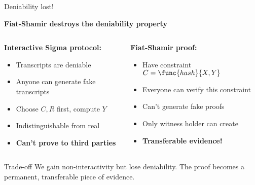 \documentclass[aspectratio=169, lualatex, handout]{beamer}
\begin{document}
\begin{frame}{Deniability lost!}
	\begin{center}
		\textbf{Fiat-Shamir destroys the deniability property}
	\end{center}
	\vspace{0.5em}
	\begin{columns}[c]
		\begin{column}{0.5\textwidth}
			\textbf{Interactive Sigma protocol:}
			\begin{itemize}
				\item Transcripts are deniable
				\item Anyone can generate fake transcripts
				\item Choose $C, R$ first, compute $Y$
				\item Indistinguishable from real
				\item \textbf{Can't prove to third parties}
			\end{itemize}
		\end{column}
		\begin{column}{0.5\textwidth}
			\textbf{Fiat-Shamir proof:}
			\begin{itemize}
				\item Have constraint $C = \func{hash}{X, Y}$
				\item Everyone can verify this constraint
				\item Can't generate fake proofs
				\item Only witness holder can create
				\item \textbf{Transferable evidence!}
			\end{itemize}
		\end{column}
	\end{columns}
	\vspace{0.5em}
	\begin{alertblock}{Trade-off}
		We gain non-interactivity but lose deniability. The proof becomes a permanent, transferable piece of evidence.
	\end{alertblock}
\end{frame}
\end{document}
